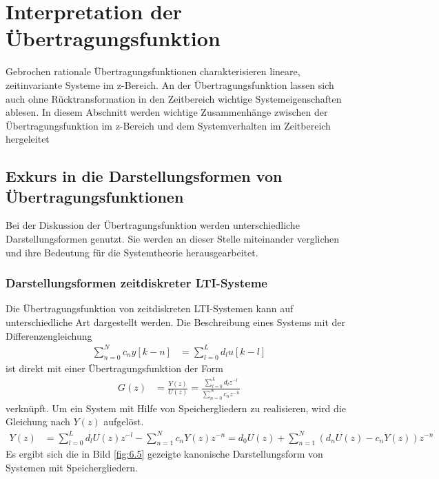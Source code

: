 \section{Interpretation der Übertragungsfunktion}\label{sec:6.3}

Gebrochen rationale Übertragungsfunktionen charakterisieren lineare, zeitinvariante Systeme im z-Bereich. An der Übertragungsfunktion lassen sich auch ohne Rücktransformation in den Zeitbereich wichtige Systemeigenschaften ablesen. In diesem Abschnitt werden wichtige Zusammenhänge zwischen der Übertragungsfunktion im z-Bereich und dem Systemverhalten im Zeitbereich hergeleitet

\subsection{Exkurs in die Darstellungsformen von Übertragungsfunktionen}\label{sec:exkurs-in-die-darstellungsformen-von-uxfcbertragungsfunktionen}

Bei der Diskussion der Übertragungsfunktion werden unterschiedliche Darstellungsformen genutzt. Sie werden an dieser Stelle miteinander verglichen und ihre Bedeutung für die Systemtheorie herausgearbeitet.

\subsubsection{Darstellungsformen zeitdiskreter LTI-Systeme}\label{sec:darstellungsformen-zeitdiskreter-lti-systeme}

Die Übertragungsfunktion von zeitdiskreten LTI-Systemen kann auf unterschiedliche Art dargestellt werden. Die Beschreibung eines Systems mit der Differenzengleichung
\begin{align}
\sum\limits_{n = 0}^{N}{c_{n}  y[ k - n]} &= \sum\limits_{l = 0}^{L}{d_{l}  u[ k - l]} \label{eq:6.51}
\end{align}
ist direkt mit einer Übertragungsfunktion der Form
\begin{align}
G(z) &= \frac{Y(z)}{U(z)} = \frac{\sum\limits_{l = 0}^{L}{d_{l}  z^{- l}}}{\sum\limits_{n = 0}^{N}{c_{n}  z^{- n}}} \label{eq:6.52}
\end{align}
verknüpft. Um ein System mit Hilfe von Speichergliedern zu realisieren, wird die Gleichung nach \(Y(z)\) aufgelöst.
\begin{align}
Y(z) &= \sum\limits_{l = 0}^{L}{d_{l}  U(z)  z^{- l}} - \sum\limits_{n = 1}^{N}{c_{n}  Y(z)  z^{- n}} = d_{0}  U(z) + \sum\limits_{n = 1}^{N}{\left( d_{n}  U(z) - c_{n}  Y(z) \right)  z^{- n}} \label{eq:6.53}
\end{align}
Es ergibt sich die in Bild \ref{fig:6.5} gezeigte kanonische Darstellungsform von Systemen mit Speichergliedern.


